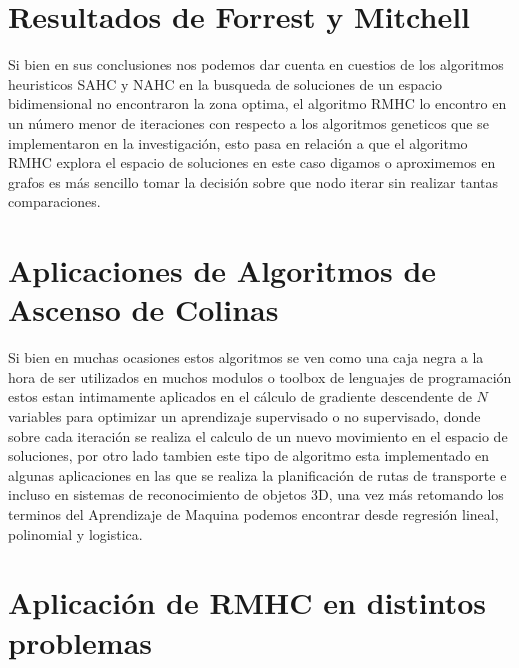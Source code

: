 \documentclass[10pt]{article}
\begin{document}
\section{Resultados de Forrest y Mitchell}
Si bien en sus conclusiones nos podemos dar cuenta en cuestios de los algoritmos heuristicos SAHC y NAHC en la busqueda de soluciones de un espacio bidimensional no encontraron la zona optima, el algoritmo RMHC lo encontro en un número menor de iteraciones con respecto a los algoritmos geneticos que se implementaron en la investigación, esto pasa en relación a que el algoritmo RMHC explora el espacio de soluciones en este caso digamos o aproximemos en grafos es más sencillo tomar la decisión sobre que nodo iterar sin realizar tantas comparaciones.
\section{Aplicaciones de Algoritmos de Ascenso de Colinas}
Si bien en muchas ocasiones estos algoritmos se ven como una caja negra a la hora de ser utilizados en muchos modulos o toolbox de lenguajes de programación estos estan intimamente aplicados en el cálculo de gradiente descendente de $N$ variables para optimizar un aprendizaje supervisado o no supervisado, donde sobre cada iteración se realiza el calculo de un nuevo movimiento en el espacio de soluciones, por otro lado tambien este tipo de algoritmo esta implementado en algunas aplicaciones en las que se realiza la planificación de rutas de transporte e incluso en sistemas de reconocimiento de objetos 3D, una vez más retomando los terminos del Aprendizaje de Maquina podemos encontrar desde regresión lineal, polinomial y logistica.
\section{Aplicación de RMHC en distintos problemas}
\end{document}

